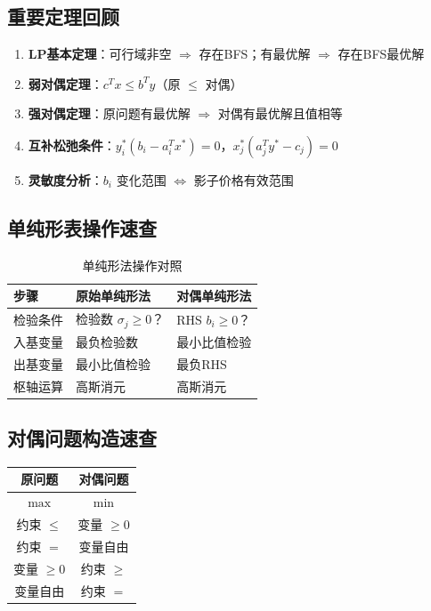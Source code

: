 \subsection{重要定理回顾}

\begin{enumerate}
    \item \textbf{LP基本定理}：可行域非空 $\Rightarrow$ 存在BFS；有最优解 $\Rightarrow$ 存在BFS最优解
    
    \item \textbf{弱对偶定理}：$c^T x \leq b^T y$（原 $\leq$ 对偶）
    
    \item \textbf{强对偶定理}：原问题有最优解 $\Rightarrow$ 对偶有最优解且值相等
    
    \item \textbf{互补松弛条件}：$y_i^*(b_i - a_i^T x^*) = 0$，$x_j^*(a_j^T y^* - c_j) = 0$
    
    \item \textbf{灵敏度分析}：$b_i$ 变化范围 $\Leftrightarrow$ 影子价格有效范围
\end{enumerate}

\subsection{单纯形表操作速查}

\begin{table}[H]
\centering
\caption{单纯形法操作对照}
\begin{tabular}{@{}lll@{}}
\toprule
\textbf{步骤} & \textbf{原始单纯形法} & \textbf{对偶单纯形法} \\
\midrule
检验条件 & 检验数 $\sigma_j \geq 0$？ & RHS $b_i \geq 0$？ \\
入基变量 & 最负检验数 & 最小比值检验 \\
出基变量 & 最小比值检验 & 最负RHS \\
枢轴运算 & 高斯消元 & 高斯消元 \\
\bottomrule
\end{tabular}
\end{table}

\subsection{对偶问题构造速查}

\begin{table}[H]
\centering
\begin{tabular}{@{}cc@{}}
\toprule
\textbf{原问题} & \textbf{对偶问题} \\
\midrule
$\max$ & $\min$ \\
约束 $\leq$ & 变量 $\geq 0$ \\
约束 $=$ & 变量自由 \\
变量 $\geq 0$ & 约束 $\geq$ \\
变量自由 & 约束 $=$ \\
\bottomrule
\end{tabular}
\end{table}

